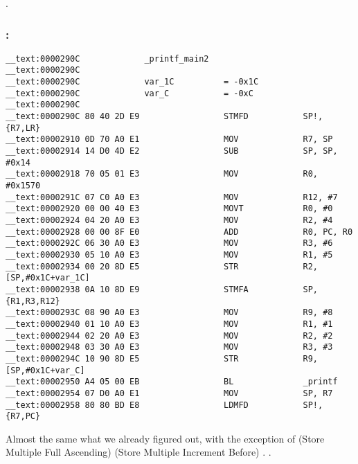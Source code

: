 .

\subsubsection{\OptimizingXcode: \ARMMode}

\begin{lstlisting}
__text:0000290C             _printf_main2
__text:0000290C
__text:0000290C             var_1C          = -0x1C
__text:0000290C             var_C           = -0xC
__text:0000290C
__text:0000290C 80 40 2D E9                 STMFD           SP!, {R7,LR}
__text:00002910 0D 70 A0 E1                 MOV             R7, SP
__text:00002914 14 D0 4D E2                 SUB             SP, SP, #0x14
__text:00002918 70 05 01 E3                 MOV             R0, #0x1570
__text:0000291C 07 C0 A0 E3                 MOV             R12, #7
__text:00002920 00 00 40 E3                 MOVT            R0, #0
__text:00002924 04 20 A0 E3                 MOV             R2, #4
__text:00002928 00 00 8F E0                 ADD             R0, PC, R0
__text:0000292C 06 30 A0 E3                 MOV             R3, #6
__text:00002930 05 10 A0 E3                 MOV             R1, #5
__text:00002934 00 20 8D E5                 STR             R2, [SP,#0x1C+var_1C]
__text:00002938 0A 10 8D E9                 STMFA           SP, {R1,R3,R12}
__text:0000293C 08 90 A0 E3                 MOV             R9, #8
__text:00002940 01 10 A0 E3                 MOV             R1, #1
__text:00002944 02 20 A0 E3                 MOV             R2, #2
__text:00002948 03 30 A0 E3                 MOV             R3, #3
__text:0000294C 10 90 8D E5                 STR             R9, [SP,#0x1C+var_C]
__text:00002950 A4 05 00 EB                 BL              _printf
__text:00002954 07 D0 A0 E1                 MOV             SP, R7
__text:00002958 80 80 BD E8                 LDMFD           SP!, {R7,PC}
\end{lstlisting}

{Almost the same what we already figured out, with the
exception of}  (Store Multiple Full Ascending) 
 (Store Multiple Increment Before) . 
.


